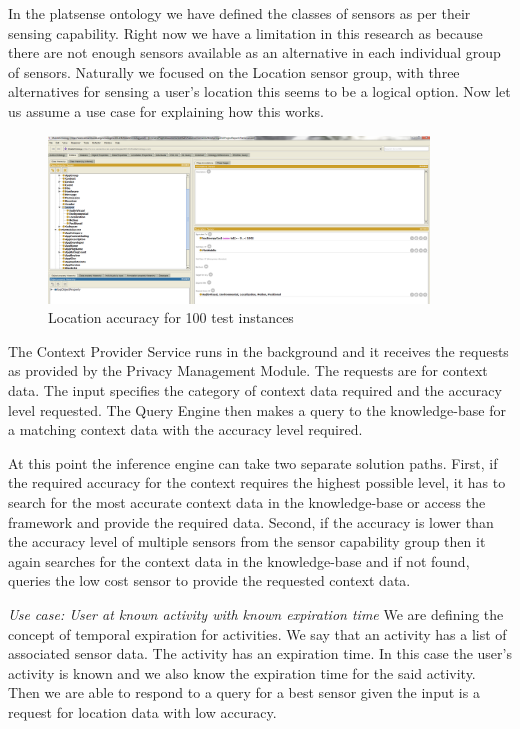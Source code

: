 \documentclass{ubicomp2013}
\begin{document}
In the platsense ontology we have defined the classes of sensors as per their sensing capability. Right now we have a limitation in this research as because there are not enough sensors available as an alternative in each individual group of sensors. Naturally we focused on the Location sensor group, with three alternatives for sensing a user's location this seems to be a logical option. Now let us assume a use case for explaining how this works. 

\begin{figure}[tbh]
\centering
\includegraphics[width=0.9\textwidth]{ontology.png}
\caption{Location accuracy for 100 test instances}
\label{fig:ontology}
\end{figure}

The Context Provider Service runs in the background and it receives the requests as provided by the Privacy Management Module. The requests are for context data. The input specifies the category of context data required and the accuracy level requested. The Query Engine then makes a query to the knowledge-base for a matching context data with the accuracy level required.

At this point the inference engine can take two separate solution paths. First,  if the required accuracy for the context requires the highest possible level, it has to search for the most accurate context data in the knowledge-base or access the framework and provide the required data. Second, if the accuracy is lower than the accuracy level of multiple sensors from the sensor capability group then it again searches for the context data in the knowledge-base and if not found, queries the low cost sensor to provide the requested context data.

{\em Use case: User at known activity with known expiration time}
We are defining the concept of temporal expiration for activities. We say that an activity has a list of associated sensor data. The activity has an expiration time. In this case the user's activity is known and we also know the expiration time for the said activity. Then we are able to respond to a query for a best sensor given the input is a request for location data with low accuracy.
\end{document}
